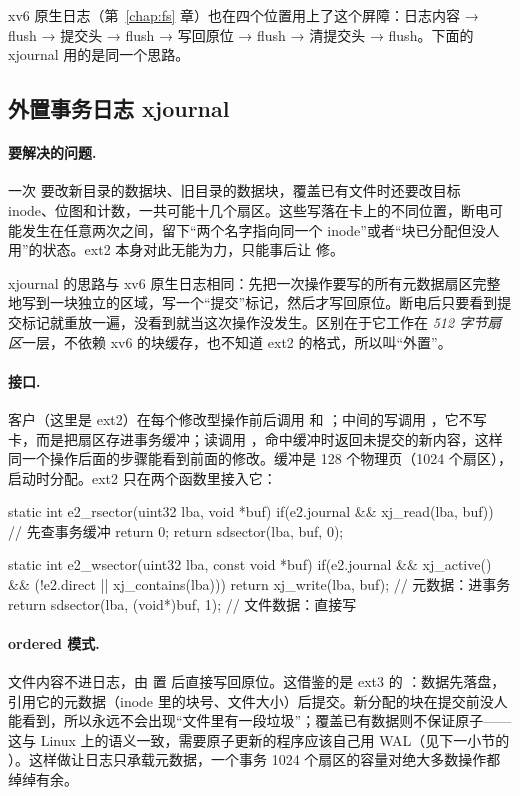 xv6 原生日志（第~\ref{chap:fs} 章）也在四个位置用上了这个屏障：日志内容 → flush → 提交头 → flush → 写回原位 → flush → 清提交头 → flush。下面的 xjournal 用的是同一个思路。

\subsection{外置事务日志 xjournal}

\paragraph{要解决的问题.} 一次  要改新目录的数据块、旧目录的数据块，覆盖已有文件时还要改目标 inode、位图和计数，一共可能十几个扇区。这些写落在卡上的不同位置，断电可能发生在任意两次之间，留下“两个名字指向同一个 inode”或者“块已分配但没人用”的状态。ext2 本身对此无能为力，只能事后让  修。

xjournal 的思路与 xv6 原生日志相同：先把一次操作要写的所有元数据扇区完整地写到一块独立的区域，写一个“提交”标记，然后才写回原位。断电后只要看到提交标记就重放一遍，没看到就当这次操作没发生。区别在于它工作在 \emph{512 字节扇区}一层，不依赖 xv6 的块缓存，也不知道 ext2 的格式，所以叫“外置”。

\paragraph{接口.} 客户（这里是 ext2）在每个修改型操作前后调用  和 ；中间的写调用 ，它不写卡，而是把扇区存进事务缓冲；读调用 ，命中缓冲时返回未提交的新内容，这样同一个操作后面的步骤能看到前面的修改。缓冲是 128 个物理页（1024 个扇区），启动时分配。ext2 只在两个函数里接入它：

\begin{ccode}
static int e2_rsector(uint32 lba, void *buf) {
  if(e2.journal && xj_read(lba, buf))                       // 先查事务缓冲
    return 0;
  return sdsector(lba, buf, 0);
}

static int e2_wsector(uint32 lba, const void *buf) {
  if(e2.journal && xj_active() && (!e2.direct || xj_contains(lba)))
    return xj_write(lba, buf);                              // 元数据：进事务
  return sdsector(lba, (void*)buf, 1);                      // 文件数据：直接写
}
\end{ccode}

\paragraph{ordered 模式.} 文件内容不进日志，由  置  后直接写回原位。这借鉴的是 ext3 的 ：数据先落盘，引用它的元数据（inode 里的块号、文件大小）后提交。新分配的块在提交前没人能看到，所以永远不会出现“文件里有一段垃圾”；覆盖已有数据则不保证原子——这与 Linux 上的语义一致，需要原子更新的程序应该自己用 WAL（见下一小节的 ）。这样做让日志只承载元数据，一个事务 1024 个扇区的容量对绝大多数操作都绰绰有余。


